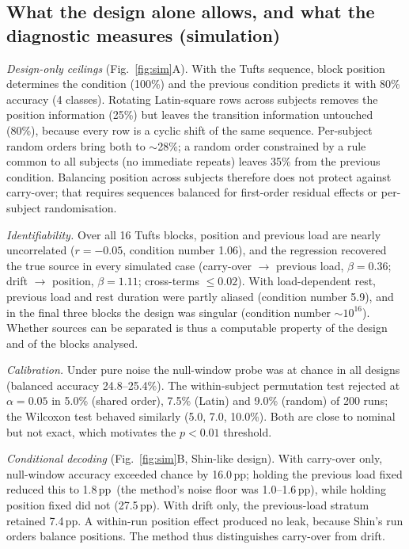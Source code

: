 \documentclass[preprint,11pt]{elsarticle}
\newcommand{\pp}{\,pp}
\begin{document}
\subsection{What the design alone allows, and what the diagnostic measures (simulation)}
\label{sec:res-sim}
\emph{Design-only ceilings} (Fig.~\ref{fig:sim}A). With the Tufts sequence, block position determines the condition (100\%) and the previous condition predicts it with 80\% accuracy (4 classes). Rotating Latin-square rows across subjects removes the position information (25\%) but leaves the transition information untouched (80\%), because every row is a cyclic shift of the same sequence. Per-subject random orders bring both to $\sim$28\%; a random order constrained by a rule common to all subjects (no immediate repeats) leaves 35\% from the previous condition. Balancing position across subjects therefore does not protect against carry-over; that requires sequences balanced for first-order residual effects \citep{williams1949} or per-subject randomisation.

\emph{Identifiability.} Over all 16 Tufts blocks, position and previous load are nearly uncorrelated ($r=-0.05$, condition number 1.06), and the regression recovered the true source in every simulated case (carry-over $\rightarrow$ previous load, $\beta=0.36$; drift $\rightarrow$ position, $\beta=1.11$; cross-terms $\le 0.02$). With load-dependent rest, previous load and rest duration were partly aliased (condition number 5.9), and in the final three blocks the design was singular (condition number $\sim 10^{16}$). Whether sources can be separated is thus a computable property of the design and of the blocks analysed.

\emph{Calibration.} Under pure noise the null-window probe was at chance in all designs (balanced accuracy 24.8--25.4\%). The within-subject permutation test rejected at $\alpha=0.05$ in 5.0\% (shared order), 7.5\% (Latin) and 9.0\% (random) of 200 runs; the Wilcoxon test behaved similarly (5.0, 7.0, 10.0\%). Both are close to nominal but not exact, which motivates the $p<0.01$ threshold.

\emph{Conditional decoding} (Fig.~\ref{fig:sim}B, Shin-like design). With carry-over only, null-window accuracy exceeded chance by 16.0\pp; holding the previous load fixed reduced this to 1.8\pp\ (the method's noise floor was 1.0--1.6\pp), while holding position fixed did not (27.5\pp). With drift only, the previous-load stratum retained 7.4\pp. A within-run position effect produced no leak, because Shin's run orders balance positions. The method thus distinguishes carry-over from drift.
\end{document}
